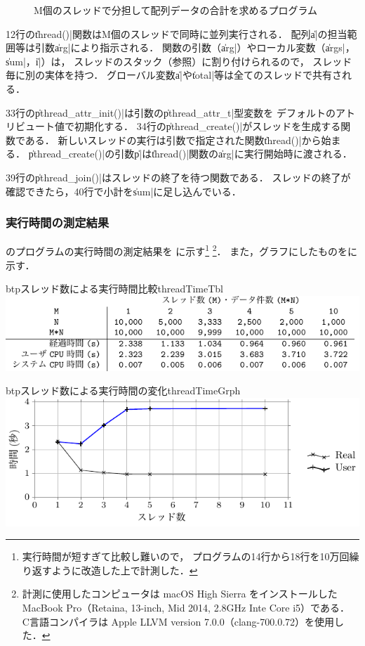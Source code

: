 \begin{figure}[btp]

\caption{M個のスレッドで分担して配列データの合計を求めるプログラム}
\label{fig:threadTest}
\end{figure}

12行の\|thread()|関数はM個のスレッドで同時に並列実行される．
配列\|a|の担当範囲等は引数\|arg|により指示される．
関数の引数（\|arg|）やローカル変数（\|args|，\|sum|，\|i|）は，
スレッドのスタック（参照）に割り付けられるので，
スレッド毎に別の実体を持つ．
グローバル変数\|a|や\|total|等は全てのスレッドで共有される．

33行の\|pthread_attr_init()|は引数の\|pthread_attr_t|型変数を
デフォルトのアトリビュート値で初期化する．
34行の\|pthread_create()|がスレッドを生成する関数である．
新しいスレッドの実行は引数で指定された関数\|thread()|から始まる．
\|pthread_create()|の引数\|p|は\|thread()|関数の\|arg|に実行開始時に渡される．

39行の\|pthread_join()|はスレッドの終了を待つ関数である．
スレッドの終了が確認できたら，40行で小計を\|sum|に足し込んでいる．

\subsubsection{実行時間の測定結果}
のプログラムの実行時間の測定結果を
に示す\footnote{
実行時間が短すぎて比較し難いので，
プログラムの14行から18行を10万回繰り返すように改造した上で計測した．}
\footnote{
計測に使用したコンピュータは
macOS High Sierra をインストールした
MacBook Pro（Retaina, 13-inch, Mid 2014, 2.8GHz Inte Core i5）である．
C言語コンパイラは
Apple LLVM version 7.0.0（clang-700.0.72）を使用した．
}．
また，グラフにしたものをに示す．

\begin{mytable}{btp}{スレッド数による実行時間比較}{threadTimeTbl}
\includegraphics[scale=1.0]{Tbl/threadTimeTbl.pdf}
\end{mytable}

\begin{myfig}{btp}{スレッド数による実行時間の変化}{threadTimeGrph}
\includegraphics[scale=0.9]{Tbl/threadTimeGrph.pdf}
\end{myfig}

